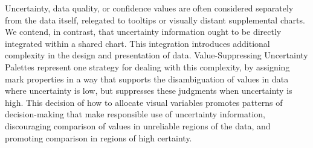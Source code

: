 Uncertainty, data quality, or confidence values are often considered separately from the data itself, relegated to tooltips or visually distant supplemental charts. We contend, in contrast, that uncertainty information ought to be directly integrated within a shared chart. This integration introduces additional complexity in the design and presentation of data. Value-Suppressing Uncertainty Palettes represent one strategy for dealing with this complexity, by assigning mark properties in a way that supports the disambiguation of values in data where uncertainty is low, but suppresses these judgments when uncertainty is high. This decision of how to allocate visual variables promotes patterns of decision-making that make responsible use of uncertainty information, discouraging comparison of values in unreliable regions of the data, and promoting comparison in regions of high certainty.
